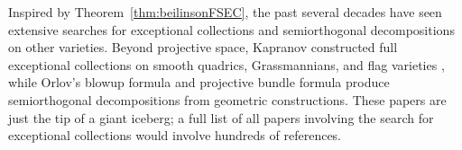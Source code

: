 \documentclass{amsart}
\begin{document}
Inspired by Theorem~\ref{thm:beilinsonFSEC}, the past several decades have seen extensive searches for exceptional collections and semiorthogonal decompositions on other varieties. %
%
Beyond projective space, Kapranov constructed full exceptional collections on smooth quadrics, Grassmannians, and flag varieties \cite{Kapranov88}, while Orlov's blowup formula \cite[Prop.~11.18]{Huybrechts2006} and projective bundle formula \cite[Cor.~8.36]{Huybrechts2006} produce semiorthogonal decompositions from geometric constructions. These papers are just the tip of a giant iceberg; a full list of all papers involving the search for exceptional collections would involve hundreds of references.
\end{document}
